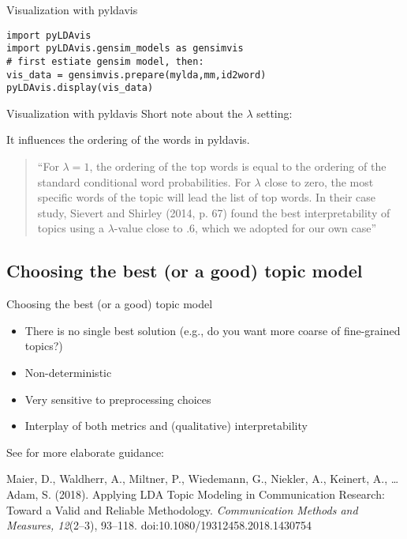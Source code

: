 \begin{frame}[plain]
\end{frame}




\begin{frame}[fragile]{Visualization with pyldavis}
\begin{lstlisting}
import pyLDAvis
import pyLDAvis.gensim_models as gensimvis
# first estiate gensim model, then:
vis_data = gensimvis.prepare(mylda,mm,id2word)
pyLDAvis.display(vis_data)
\end{lstlisting}
\end{frame}

\begin{frame}{Visualization with pyldavis}
Short note about the $\lambda$ setting:

It influences the ordering of the words in pyldavis.

\begin{quote}
``For $\lambda = 1$, the ordering of the top words is equal to the ordering of the standard conditional word probabilities. For $\lambda$ close to zero, the most specific words of the topic will lead the list of top words. In their case study, Sievert and Shirley (2014, p. 67) found the best interpretability of topics using a  $\lambda$-value close to .6, which we adopted for our own case'' \parencite[p.~107]{Maier2018a}
\end{quote}

\end{frame}




\subsection{Choosing the best (or a good) topic model}

\begin{frame}{Choosing the best (or a good) topic model}
\begin{itemize}
\item There is no single best solution (e.g., do you want more coarse of fine-grained topics?)
\item Non-deterministic
\item Very sensitive to preprocessing choices
\item Interplay of both metrics and (qualitative) interpretability 
\end{itemize}

See for more elaborate guidance:

\tiny{Maier, D., Waldherr, A., Miltner, P., Wiedemann, G., Niekler, A., Keinert, A., \ldots Adam, S. (2018). Applying LDA Topic Modeling in Communication Research: Toward a Valid and Reliable Methodology. \textit{Communication Methods and Measures, 12}(2--3), 93--118. doi:10.1080/19312458.2018.1430754}

\end{frame}



